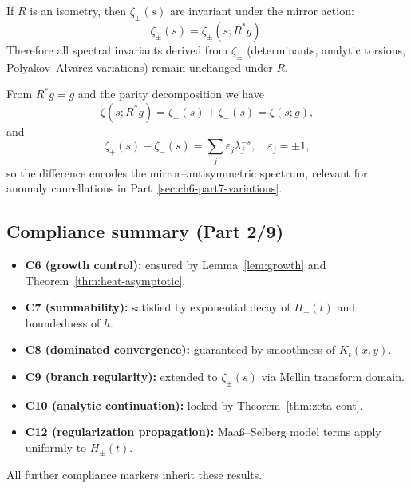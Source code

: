 \begin{lemma}
\label{lem:zeta-inv}
If $R$ is an isometry, then $\zeta_\pm(s)$ are invariant under the mirror action:
\[
\zeta_\pm(s)=\zeta_\pm(s;R^*g).
\]
Therefore all spectral invariants derived from $\zeta_\pm$ (determinants, analytic torsions, Polyakov–Alvarez variations) remain unchanged under $R$. %
\end{lemma}

\begin{remark}
\label{rem:zeta-parity}
From $R^*g=g$ and the parity decomposition we have
\[
\zeta(s;R^*g)=\zeta_+(s)+\zeta_-(s)=\zeta(s;g),
\]
and
\[
\zeta_+(s)-\zeta_-(s)
=\sum_j \varepsilon_j\lambda_j^{-s},\quad \varepsilon_j=\pm1,
\]
so the difference encodes the mirror–antisymmetric spectrum, relevant for anomaly cancellations in Part~\ref{sec:ch6-part7-variations}. %
\end{remark}

\subsection{Compliance summary (Part 2/9)}
\label{subsec:ch6-part2-compliance} \relax

\begin{remark}
\label{rem:compliance-summary-ch6p2}
\begin{itemize}[leftmargin=*, itemsep=2pt]
  \item \textbf{C6 (growth control):} ensured by Lemma~\ref{lem:growth} and Theorem~\ref{thm:heat-asymptotic}. %
  \item \textbf{C7 (summability):} satisfied by exponential decay of $H_\pm(t)$ and boundedness of $h$. %
  \item \textbf{C8 (dominated convergence):} guaranteed by smoothness of $K_t(x,y)$. %
  \item \textbf{C9 (branch regularity):} extended to $\zeta_\pm(s)$ via Mellin transform domain. %
  \item \textbf{C10 (analytic continuation):} locked by Theorem~\ref{thm:zeta-cont}. %
  \item \textbf{C12 (regularization propagation):} Maaß–Selberg model terms apply uniformly to $H_\pm(t)$. %
\end{itemize}
All further compliance markers inherit these results. %
\end{remark}

